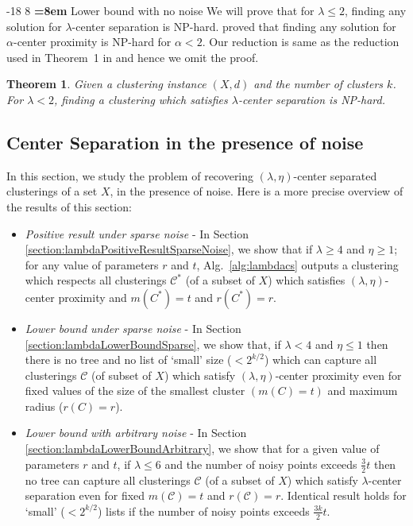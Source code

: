 \documentclass[12pt]{article}
\makeatletter
\newtheorem{theorem}{Theorem}
\newcommand{\mc}{\mathcal}
\renewcommand\subsubsection{\@startsection{subsubsection}{3}{\z@}%
   {-18\p@ \@plus -4\p@ \@minus -4\p@}%
   {8\p@ \@plus 4\p@ \@minus 4\p@}%
   {\normalfont\normalsize\bfseries\boldmath
   \rightskip=\z@ \@plus 8em \pretolerance=10000}}
\makeatother
\begin{document}

\subsubsection{Lower bound with no noise}
\label{section:lowerBdNoNoiseLambda}
We will prove that for $\lambda \le 2$, finding any solution for $\lambda$-center separation is NP-hard. \cite{reyzin2012data} proved that finding any solution for $\alpha$-center proximity is NP-hard for $\alpha < 2$. Our reduction is same as the reduction used in Theorem~1 in \cite{reyzin2012data} and hence we omit the proof.

\begin{theorem}
\label{thm:lambdaNoNoiseLowerBd}
Given a clustering instance $(X, d)$ and the number of clusters $k$. For $\lambda < 2$, finding a clustering which satisfies $\lambda$-center separation is NP-hard.
\end{theorem}

\subsection{Center Separation in the presence of noise}
\label{sec:cswith}
In this section, we study the problem of recovering $(\lambda, \eta)$-center separated clusterings of a set $X$, in the presence of noise. Here is a more precise overview of the results of this section:
\begin{itemize}[nolistsep,noitemsep,leftmargin=*]
\item  {\it Positive result under sparse noise} - In Section \ref{section:lambdaPositiveResultSparseNoise}, we show that if $\lambda \ge 4$ and $\eta \ge 1$; for any value of parameters $r$ and $t$, Alg.~\ref{alg:lambdacs} outputs a clustering which respects all clusterings $\mc C^*$ (of a subset of $X$) which satisfies $(\lambda, \eta)$-center proximity and $m(C^*)=t$ and $r(C^*) = r$.
\item  {\it Lower bound under sparse noise} - In Section \ref{section:lambdaLowerBoundSparse}, we show that, if $\lambda < 4$ and $\eta \le 1$ then there is no tree and no list of `small' size ($<2^{k/2}$) which can capture all clusterings $\mc C$ (of subset of $X$) which satisfy $(\lambda, \eta)$-center proximity even for fixed values of the size of the smallest cluster $(m(C) = t)$ and maximum radius ($r(C) = r$).
\item {\it Lower bound with arbitrary noise} - In Section \ref{section:lambdaLowerBoundArbitrary}, we show that for a given value of parameters $r$ and $t$, if $\lambda \le 6$ and the number of noisy points exceeds $\frac{3}{2}t$ then no tree can capture all clusterings $\mc C$ (of a subset of $X$) which satisfy $\lambda$-center separation even for fixed $m(\mc C) = t$ and $r(\mc C) = r$. Identical result holds for `small' ($<2^{k/2}$) lists if the number of noisy points exceeds $\frac{3k}{2}t$.
\end{itemize}
\end{document}
